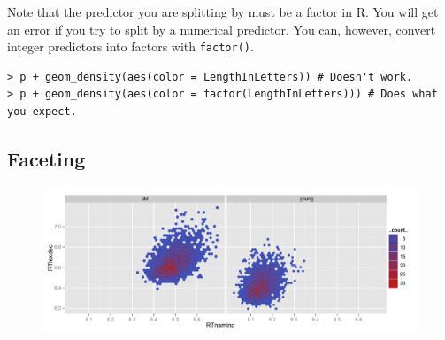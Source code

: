\documentclass[oneside,10pt]{article}
\begin{document}
Note that the predictor you are splitting by must be a factor in R. You will get an error if you try to split by a numerical predictor. You can, however, convert integer predictors into factors with \verb!factor()!. 

\begin{verbatim}
> p + geom_density(aes(color = LengthInLetters)) # Doesn't work.
> p + geom_density(aes(color = factor(LengthInLetters))) # Does what you expect.
\end{verbatim}

\subsection{Faceting}

\begin{figure}[htbp]
  \includegraphics[width = 1\linewidth]{hexbin-facets}
  \label{fig:three}
\end{figure}

  
\end{document}
